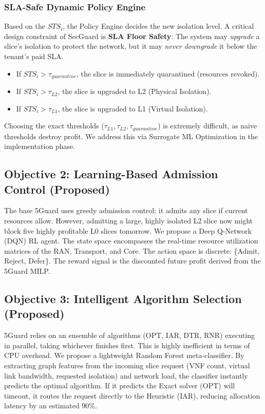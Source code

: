 \documentclass[12pt]{article}
\begin{document}
\subsubsection{SLA-Safe Dynamic Policy Engine}
Based on the $STS_i$, the Policy Engine decides the new isolation level. A critical design constraint of SecGuard is \textbf{SLA Floor Safety}: The system may \textit{upgrade} a slice's isolation to protect the network, but it may \textit{never downgrade} it below the tenant's paid SLA. 
\begin{itemize}
    \item If $STS_i > \tau_{quarantine}$, the slice is immediately quarantined (resources revoked).
    \item If $STS_i > \tau_{L2}$, the slice is upgraded to L2 (Physical Isolation).
    \item If $STS_i > \tau_{L1}$, the slice is upgraded to L1 (Virtual Isolation).
\end{itemize}
Choosing the exact thresholds ($\tau_{L1}, \tau_{L2}, \tau_{quarantine}$) is extremely difficult, as naive thresholds destroy profit. We address this via Surrogate ML Optimization in the implementation phase.

\subsection{Objective 2: Learning-Based Admission Control (Proposed)}
The base 5Guard uses greedy admission control; it admits any slice if current resources allow. However, admitting a large, highly isolated L2 slice now might block five highly profitable L0 slices tomorrow. We propose a Deep Q-Network (DQN) RL agent. The state space encompasses the real-time resource utilization matrices of the RAN, Transport, and Core. The action space is discrete: \{Admit, Reject, Defer\}. The reward signal is the discounted future profit derived from the 5Guard MILP.

\subsection{Objective 3: Intelligent Algorithm Selection (Proposed)}
5Guard relies on an ensemble of algorithms (OPT, IAR, DTR, RNR) executing in parallel, taking whichever finishes first. This is highly inefficient in terms of CPU overhead. We propose a lightweight Random Forest meta-classifier. By extracting graph features from the incoming slice request (VNF count, virtual link bandwidth, requested isolation) and network load, the classifier instantly predicts the optimal algorithm. If it predicts the Exact solver (OPT) will timeout, it routes the request directly to the Heuristic (IAR), reducing allocation latency by an estimated 90\%.
\end{document}
